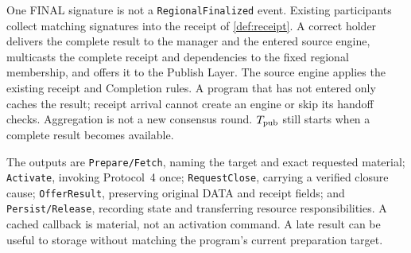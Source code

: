 \documentclass[11pt,a4paper]{article}
\begin{document}
One FINAL signature is not a \texttt{RegionalFinalized} event. Existing
participants collect matching signatures into the receipt of
\cref{def:receipt}. A correct holder delivers the complete result to
the manager and the entered source engine, multicasts the complete
receipt and dependencies to the fixed regional membership, and offers
it to the Publish Layer. The source engine applies the existing receipt and Completion
rules. A program that has not entered only caches the result; receipt
arrival cannot create an engine or skip its handoff checks. Aggregation
is not a new consensus round. $T_{\rm pub}$ still starts when a complete
result becomes available.

The outputs are \texttt{Prepare/Fetch}, naming the target and exact
requested material; \texttt{Activate}, invoking Protocol~4 once;
\texttt{RequestClose}, carrying a verified closure cause;
\texttt{OfferResult}, preserving original DATA and receipt fields;
and \texttt{Persist/Release}, recording state and transferring resource
responsibilities. A cached callback is material, not an activation
command. A late result can be useful to storage without matching the
program's current preparation target.


\end{document}
